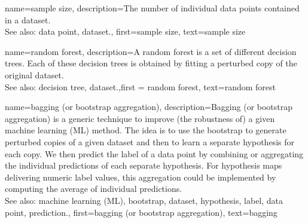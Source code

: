 	
{name={sample size},
  description={The number of individual data points 
		contained in a dataset.
				\\
		See also: data point, dataset.},
  first={sample size},
  text={sample size}
}



{name={random forest},
	description={A random forest is a set of different decision trees. 
		Each of these decision trees is obtained by fitting a perturbed copy of 
		the original dataset.
				\\
		See also: decision tree, dataset.},first = {random forest}, text={random forest}
}

{name={bagging (or bootstrap aggregation)},
description={Bagging (or bootstrap aggregation) 
		is a generic technique to improve (the robustness of) a given machine learning (ML) method. 
		The idea is to use the bootstrap to generate perturbed copies of a given dataset 
		and then to learn a separate hypothesis for each copy. We then predict the 
		label of a data point by combining or aggregating the individual predictions 
		of each separate hypothesis. For hypothesis maps delivering numeric label 
		values, this aggregation could be implemented by computing the average of individual 
		predictions.
				\\
		See also: machine learning (ML), bootstrap, dataset, hypothesis, label, data point, prediction.},
		first={bagging (or bootstrap aggregation)},
		text={bagging}}

